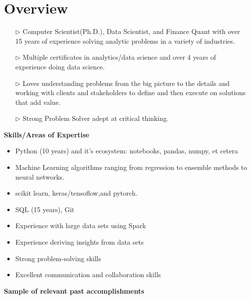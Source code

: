 \documentclass[10pt, letterpaper]{article} %
\providecommand{\tightlist}{%
  \setlength{\itemsep}{0pt}\setlength{\parskip}{0pt}}
\begin{document}
\vspace{-5pt}
\hypertarget{professional-experience}{\section{\texorpdfstring{
{ \textbf{ {Overview}}}}{Overview}}\label{professional-experience}}
\begin{itemize}
\tightlist

\item[$\triangleright$] Computer Scientist(Ph.D.), Data Scientist, and Finance Quant with over 15 years of experience solving analytic problems in a variety of industries. 

\item[$\triangleright$] Multiple certificates in analytics/data science and over 4 years of experience doing data science. 

\item[$\triangleright$] Loves understanding problems from the big picture to the details and working with clients and stakeholders to define and then execute on solutions that add value.

\item[$\triangleright$]  Strong Problem Solver adept at critical thinking. 
\end{itemize}
{\textbf {Skills/Areas of Expertise}}
\vspace{-7pt}
\begin{multicols}{2}
  \begin{itemize}
	\tightlist
	\item Python (10 years) and it's ecosystem: notebooks, pandas, numpy, et cetera 
	\item Machine Learning algorithms ranging from regression to ensemble methods to neural networks.	
	\item scikit learn, keras/tensoflow,and pytorch.
	\item SQL (15 years), Git
	\item Experience with large data sets using Spark
	\item Experience deriving insights from data sets
	\item Strong problem-solving skills
     \item Excellent communication and collaboration skills
\end{itemize}
\end{multicols}
\vspace{-10pt}
 {\textbf {Sample of relevant past accomplishments}}  
 \vspace{-3pt}
\end{document}
